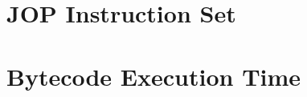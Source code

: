 \chapter{JOP Instruction Set} \label{appx:jop:instr}


\chapter{Bytecode Execution Time} \label{appx:bytecode}


%

%



